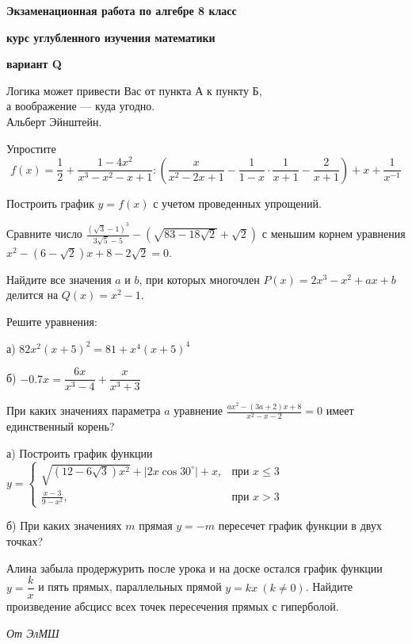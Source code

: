 \centerline{\Huge \bf  Экзаменационная работа по алгебре 8 класс}
\centerline{\Huge \bf курс углубленного изучения математики}
\centerline{\Large \bf вариант Q}

\begin{flushright}
    \scriptsize{Логика может привести Вас от пункта А к пункту Б,\\ а воображение — куда угодно.\\ Альберт Эйнштейн.}
\end{flushright}

Упростите 
\[f(x) = \dfrac{1}{2} + \dfrac{1 - 4x^2}{x^3 - x^2 - x + 1} : \left( \dfrac{x}{x^2 - 2x + 1} - \dfrac{1}{1-x} \cdot \dfrac{1}{x + 1} - \dfrac{2}{x+1} \right) + x + \dfrac{1}{x^{- 1}}\]

Построить график $y = f(x)$ с учетом проведенных упрощений.

Сравните число $\frac{(\sqrt{3} - 1)^3}{3\sqrt{5} - 5} - \left( \sqrt{83 - 18\sqrt{2}} + \sqrt{2} \right)$ с меньшим корнем уравнения \\ $x^2 - \left( 6 - \sqrt{2} \right)x + 8 - 2\sqrt{2} = 0$.

Найдите все значения $a$ и $b$, при которых многочлен $P(x) = 2x^3 - x^2 + ax + b$ делится на $Q(x) = x^2 - 1$.

Решите уравнения:

а) $82x^2(x + 5)^2 = 81 + x^4(x + 5)^4$

б) $-0.7x = \dfrac{6x}{x^3 - 4} + \dfrac{x}{x^3 + 3}$

При каких значениях параметра $a$ уравнение $\frac{ax^2 - (3a + 2)x + 8}{x^2 - x - 2} = 0$ имеет единственный корень?

а) Построить график функции $y = 
\begin{cases}
    \sqrt{(12 - 6 \sqrt{3})x^2} + |2x \cos 30^\circ| + x, & \text{при } x \leq 3 \\
    \frac{x - 3}{9 - x^2}, & \text{при } x > 3
\end{cases}$

б) При каких значениях $m$ прямая $y=-m$ пересечет график функции в двух точках?


Алина забыла продержурить после урока и на доске остался график функции  $y = \dfrac{k}{x}$  и пять прямых, параллельных прямой  $y = kx \ (k \neq 0)$. Найдите произведение абсцисс всех точек пересечения прямых с гиперболой.

\begin{flushright}
    \textit{\small{От ЭлМШ}}
\end{flushright}

